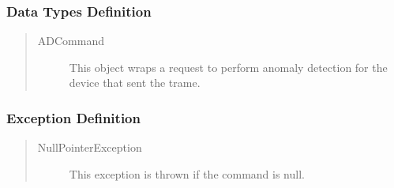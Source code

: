 \subsubsection{Data Types Definition}

\begin{quote}
	\begin{description}
		\item[ADCommand] This object wraps a request to perform anomaly detection for
		the device that sent the trame.	
	\end{description} 
\end{quote}

\subsubsection{Exception Definition}

\begin{quote}
	\begin{description}
		\item[NullPointerException] This exception is thrown if the command is null.
	\end{description} 
\end{quote}